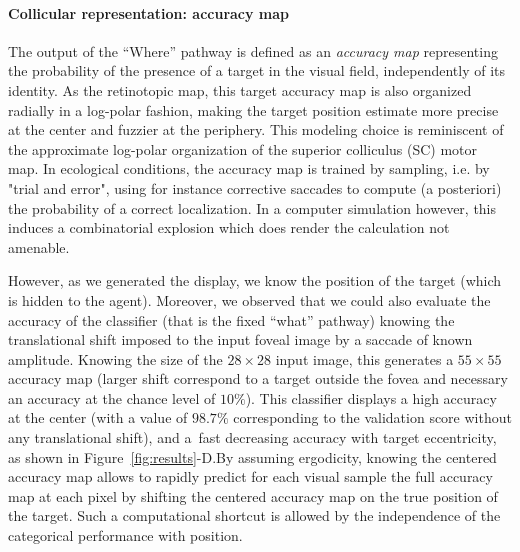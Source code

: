 \paragraph{Collicular representation: accuracy map}
The output of the ``Where'' pathway is defined as an \emph{accuracy map} representing the probability of the presence of a target in the visual field, independently of its identity. As the retinotopic map, this target accuracy map is also organized radially in a log-polar fashion, making the target position estimate more precise at the center and fuzzier at the periphery. \ICANN This modeling choice is reminiscent of the approximate log-polar organization of the superior colliculus (SC) motor map. In ecological conditions, the accuracy map is trained by sampling, i.e. by "trial and error", using for instance corrective saccades to compute (a posteriori) the probability of a correct localization. In a computer simulation however, this induces a combinatorial explosion which does render the calculation not amenable.\fi

However, as we generated the display, we know the position of the target (which is hidden to the agent). Moreover, we observed that we could also evaluate the accuracy of the classifier (that is the fixed ``what'' pathway) knowing the translational shift imposed to the input foveal image by a saccade of known amplitude. Knowing the size of the $28\times 28$ input image, this generates a $55\times 55$ accuracy map (larger shift correspond to a target outside the fovea and necessary an accuracy at the chance level of $10\%$). \ICANN This classifier displays a high accuracy at the center  (with a value of $98.7\%$ corresponding to the validation score without any translational shift), and a fast decreasing accuracy with target eccentricity, as shown in Figure~\ref{fig:results}-D.\fi By assuming ergodicity, knowing the centered accuracy map allows to rapidly predict for each visual sample the full accuracy map at each pixel by shifting the centered accuracy map on the true position of the target. Such a computational shortcut is allowed by the independence of the categorical performance with position. %

